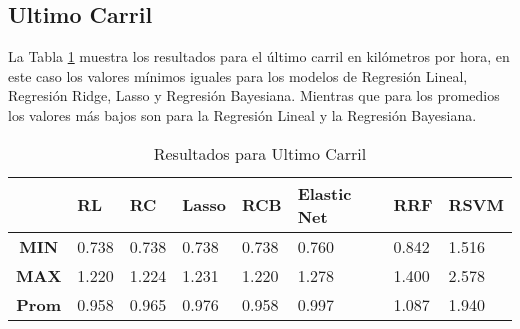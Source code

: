 \subsection{Ultimo Carril}

La Tabla \ref{tab:resultadosScikitUltimoCarril} muestra los resultados para el último carril en kilómetros por hora, en este caso los valores mínimos iguales para los modelos de Regresión Lineal, Regresión Ridge, Lasso y Regresión Bayesiana. Mientras que para los promedios los valores más bajos son para la Regresión Lineal y la Regresión Bayesiana.

\begin{table}[H]
    \centering
    \caption{Resultados para Ultimo Carril}
    \label{tab:resultadosScikitUltimoCarril}
    \begin{tabular}{|c|l|l|l|l|l|l|l|} \hline
        & \textbf{RL} & \textbf{RC} & \textbf{Lasso} & \textbf{RCB} & \textbf{Elastic Net} & \textbf{RRF} & \textbf{RSVM} \\ \hline
        \textbf{MIN} & 0.738 & 0.738 & 0.738 & 0.738 & 0.760 & 0.842 & 1.516 \\ \hline
        \textbf{MAX} & 1.220 & 1.224 & 1.231 & 1.220 & 1.278 & 1.400 & 2.578 \\ \hline
        \textbf{Prom} & 0.958 & 0.965 & 0.976 & 0.958 & 0.997 & 1.087 & 1.940 \\ \hline
    \end{tabular}
\end{table}

